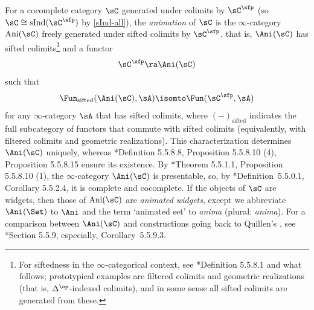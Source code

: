  \label{animation}
 For a cocomplete %
 category $\sC$ generated under colimits by $\sC^{\sfp}$ (so $\sC \cong \mathrm{sInd}(\sC^\sfp)$ by \eqref{sInd-all}),
 the \emph{animation} of $\sC$ is the $\infty$-category $\mathrm{Ani}(\sC)$ freely  generated under sifted colimits by $\sC^{\sfp}$, that is, $\Ani(\sC)$ has sifted colimits\footnote{For siftedness in the $\infty$-categorical context, see \cite{HTT}*{Definition 5.5.8.1 and what follows}; prototypical examples are filtered colimits and geometric realizations (that is, $\Delta^\op$-indexed colimits), and in some sense all sifted colimits are generated from these.} and a functor
 \[
 \sC^\sfp \ra \Ani(\sC)
 \]
such that
\[
\Fun_{\mathrm{sifted}}(\Ani(\sC), \sA) \isomto \Fun(\sC^\sfp, \sA)
\]
for any $\infty$-category $\sA$ that has sifted colimits, where $(-)_{\mathrm{sifted}}$ indicates the full subcategory of functors that commute with sifted colimits (equivalently, with filtered colimits and geometric realizations). This characterization determines $\Ani(\sC)$ uniquely, %
whereas \cite{HTT}*{Definition 5.5.8.8, Proposition 5.5.8.10 (4), Proposition 5.5.8.15} ensure its existence. By \cite{HTT}*{Theorem 5.5.1.1, Proposition 5.5.8.10 (1)}, the $\infty$-category $\Ani(\sC)$ is presentable, so, by \cite{HTT}*{Definition~5.5.0.1, Corollary 5.5.2.4}, it is complete and cocomplete. If the objects of $\sC$ are widgets, then those of $\mathrm{Ani}(\sC)$ are \emph{animated widgets}, except we abbreviate $\Ani(\Set)$ to $\Ani$ and the term `animated set' to \emph{anima} (plural: \emph{anima}). For a comparison between $\Ani(\sC)$ and constructions going back to Quillen's \cite{Qui67}, see \cite{HTT}*{Section 5.5.9, especially, Corollary~5.5.9.3}.

